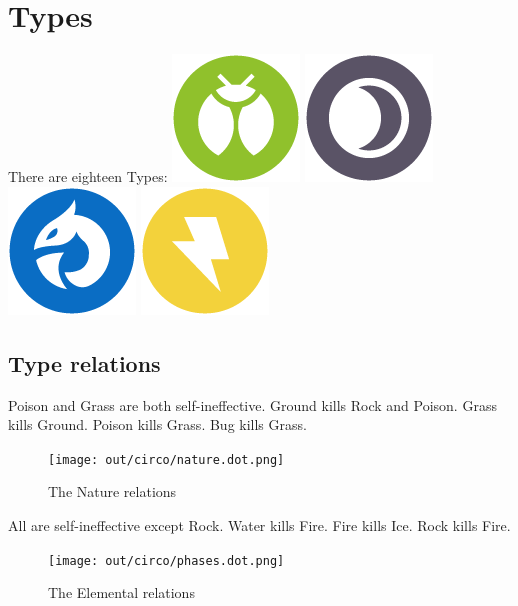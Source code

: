 \chapter{Types}
There are eighteen Types:
\includegraphics[scale=.25]{images/bug.png}
\includegraphics[scale=.25]{images/dark.png}
\includegraphics[scale=.25]{images/dragon.png}
\includegraphics[scale=.25]{images/electric.png}

\section{Type relations}
Poison and Grass are both self-ineffective.
Ground kills Rock and Poison.
Grass kills Ground.
Poison kills Grass.
Bug kills Grass.
\begin{figure}
\centering
\texttt{[image: out/circo/nature.dot.png]}
\caption{The Nature relations}
\end{figure}

All are self-ineffective except Rock.
Water kills Fire.
Fire kills Ice.
Rock kills Fire.
\begin{figure}
\centering
\texttt{[image: out/circo/phases.dot.png]}
\caption{The Elemental relations}
\end{figure}

